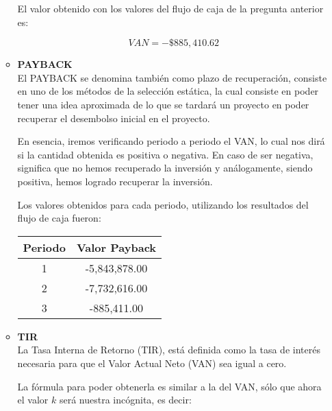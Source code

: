 \begin{enumerate}[(a)]
\begin{itemize}
                    El valor obtenido con los valores del flujo de caja de la pregunta anterior es:

                    $$VAN = -\$885,410.62$$

                \item {\bf PAYBACK}\\

                    El PAYBACK se denomina también como plazo de recuperación,
                    consiste en uno de los métodos de la selección estática,
                    la cual consiste en poder tener una idea aproximada
                    de lo que se tardará un proyecto en poder recuperar
                    el desembolso inicial en el proyecto.


                   En esencia, iremos verificando periodo a periodo el VAN, lo cual nos dirá si la cantidad obtenida
                   es positiva o negativa. En caso de ser negativa, significa que no hemos  recuperado la inversión
                   y análogamente, siendo positiva, hemos logrado recuperar la inversión.


                   Los valores obtenidos para cada periodo, utilizando los resultados del flujo de caja fueron:

                   \begin{table}[h!t]
                        \centering
                        \begin{tabular}{|c|c|}
                            \hline
                            {\bf Periodo} & Valor Payback \\\hline
                            1 & -5,843,878.00 \\
                            2 & -7,732,616.00 \\
                            3 &   -885,411.00 \\ \hline
                        \end{tabular}
                   \end{table}

                \item {\bf TIR}\\

                    La Tasa Interna de Retorno (TIR), está definida como la tasa de interés necesaria para que el Valor Actual Neto (VAN) sea igual a cero.

                    La fórmula para poder obtenerla es similar a la del VAN, sólo que ahora el valor $k$ será nuestra incógnita, es decir:


\end{itemize}
\end{enumerate}
